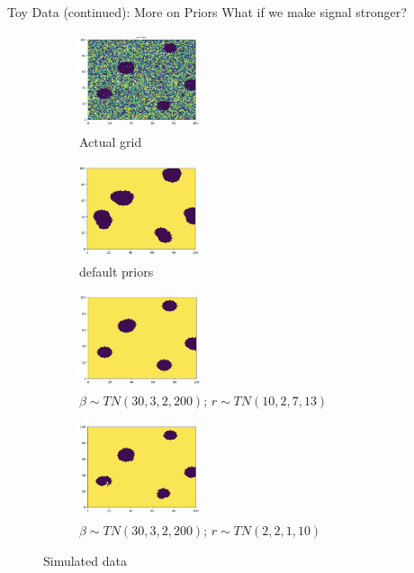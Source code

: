 \documentclass[10pt,mathserif]{beamer}
\begin{document}
\begin{frame}{Toy Data (continued): More on Priors}
What if we make signal stronger?
\begin{figure}[t!]
    \centering
    \begin{subfigure}[t]{0.3\textwidth}
        \centering
        \includegraphics[height=1.1in, width=1.4in]{../BDC_gridactual}
        \caption{Actual grid}
    \end{subfigure}%
    \begin{subfigure}[t]{0.3\textwidth}
        \centering
        \includegraphics[height=1.1in, width=1.4in]{../BDC_grid1}
        \caption{default priors}
    \end{subfigure} %
    \begin{subfigure}[t]{0.3\textwidth}
        \centering
        \includegraphics[height=1.1in, width=1.4in]{../BDC_grid4_bigradius_ss}
        \caption{ $\beta \sim TN(30, 3, 2, 200)$; $r \sim TN(10, 2, 7, 13)$}
    \end{subfigure}%
        \begin{subfigure}[t]{0.3\textwidth}
        \centering
        \includegraphics[height=1.1in, width=1.4in]{../BDC_grid5_smallradius_ss}
        \caption{ $\beta \sim TN(30, 3, 2, 200)$; $r \sim TN(2, 2, 1, 10)$}
    \end{subfigure}
    \caption{Simulated data}
\end{figure}
\end{frame}
\end{document}

